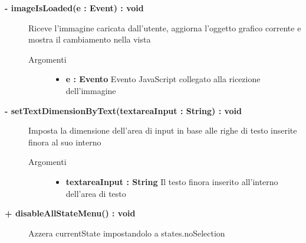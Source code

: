 \begin{description}
	\begin{description}
		\item[\textbf{\color{blue}- imageIsLoaded(e : Event) : void		}] \hfill
			Riceve l'immagine caricata dall'utente, aggiorna l'oggetto grafico corrente e mostra il cambiamento nella vista
			
		\begin{description}
			\item[Argomenti] \hfill
				\begin{itemize}
				
					\item \textbf{e :  Evento		} \hfill
					Evento JavaScript collegato alla ricezione dell'immagine
					
				\end{itemize}
			
		\end{description}
	\end{description}
	
	\begin{description}
		\item[\textbf{\color{blue}- setTextDimensionByText(textareaInput : String) : void		}] \hfill
			Imposta la dimensione dell'area di input in base alle righe di testo inserite finora al suo interno
			
		\begin{description}
			\item[Argomenti] \hfill
				\begin{itemize}
				
					\item \textbf{textareaInput : String		} \hfill
					Il testo finora inserito all'interno dell'area di testo
					
				\end{itemize}
			
		\end{description}
	\end{description}
	
	\begin{description}
		\item[\textbf{\color{blue}+ disableAllStateMenu() : void		}] \hfill
			Azzera currentState impostandolo a states.noSelection
			
	\end{description}
	

\end{description}
